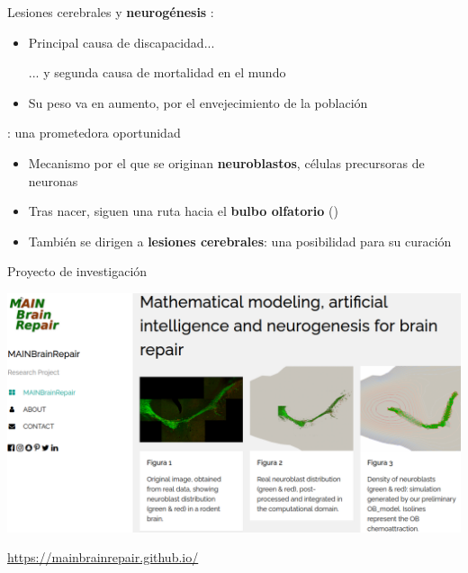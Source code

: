\documentclass[
  unknownkeysallowed %
]{beamer}
\begin{document}
\begin{frame}{Lesiones cerebrales y \textbf{neurogénesis}}
  :
  \begin{itemize}
  \item Principal causa de discapacidad... \par\smallskip
    ... y segunda causa de mortalidad en el mundo
  \item Su peso va en aumento, por el envejecimiento de la población
  \end{itemize}
  \bigskip
\textbf{}:  una prometedora oportunidad
\begin{itemize}
\item Mecanismo por el que se originan \textbf{neuroblastos}, células precursoras de neuronas
\item Tras nacer, siguen una ruta hacia el \textbf{bulbo olfatorio} ()
\item También se dirigen a \textbf{lesiones cerebrales}: una posibilidad para su curación
\end{itemize}
\end{frame}

\begin{frame}{Proyecto de investigación}
  \vspace{2em}
  \begin{center}
    \includegraphics[width=1.0\linewidth]{img/MAINBrainRepair}
\end{center}
\begin{flushright}
  \scriptsize
  \url{https://mainbrainrepair.github.io/}
\end{flushright}
\end{frame}
\end{document}
